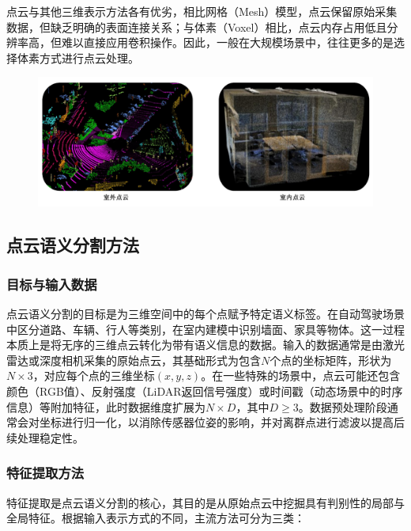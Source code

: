 点云与其他三维表示方法各有优劣，相比网格（Mesh）模型，点云保留原始采集数据，但缺乏明确的表面连接关系；与体素（Voxel）相比，点云内存占用低且分辨率高，但难以直接应用卷积操作。因此，一般在大规模场景中，往往更多的是选择体素方式进行点云处理。%
\vspace{-0.1cm}
\begin{figure}[h]
    \centering
    \includegraphics[width = \textwidth, scale=0.5]{ljx/figure/2-1PC.pdf}
    \label{fig:2-1}
\end{figure}
\vspace{-0.35cm}
\subsection{点云语义分割方法}
\subsubsection{目标与输入数据}
点云语义分割的目标是为三维空间中的每个点赋予特定语义标签。在自动驾驶场景中区分道路、车辆、行人等类别，在室内建模中识别墙面、家具等物体。这一过程本质上是将无序的三维点云转化为带有语义信息的数据。输入的数据通常是由激光雷达或深度相机采集的原始点云，其基础形式为包含$N$个点的坐标矩阵，形状为$N \times 3$，对应每个点的三维坐标$(x, y, z)$。在一些特殊的场景中，点云可能还包含颜色（RGB值）、反射强度（LiDAR返回信号强度）或时间戳（动态场景中的时序信息）等附加特征，此时数据维度扩展为$N \times D$，其中$D \geq 3$。数据预处理阶段通常会对坐标进行归一化，以消除传感器位姿的影响，并对离群点进行滤波以提高后续处理稳定性。

\subsubsection{特征提取方法}
特征提取是点云语义分割的核心，其目的是从原始点云中挖掘具有判别性的局部与全局特征。根据输入表示方式的不同，主流方法可分为三类：

